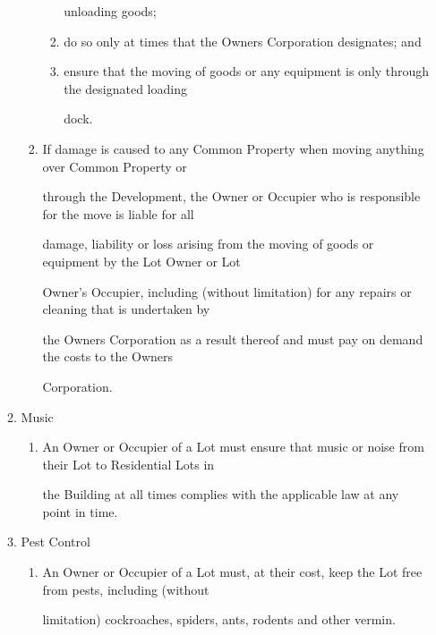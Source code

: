 \documentclass{article}
\begin{document}
\begin{enumerate}[label=\arabic*.]
\begin{enumerate}[label=\arabic{enumi}.\arabic*.]
\begin{enumerate}[label=(\arabic*)]
\begin{enumerate}[label=(\alph*)]
{\fontsize{10.02}{1}unloading goods; }

\item {\fontsize{9.962}{1} do so only at times that the Owners Corporation designates; and }

\item {\fontsize{9.962}{1} ensure that the moving of goods or any equipment is only through the designated loading }

{\fontsize{10.02}{1}dock. }

\end{enumerate}
\item {\fontsize{9.962}{1} If damage is caused to any Common Property when moving anything over Common Property or }

{\fontsize{10.02}{1}through the Development, the Owner or Occupier who is responsible for the move is liable for all }

{\fontsize{10.02}{1}damage, liability or loss arising from the moving of goods or equipment by the Lot Owner or Lot }

{\fontsize{10.02}{1}Owner’s Occupier, including (without limitation) for any repairs or cleaning that is undertaken by }

{\fontsize{10.02}{1}the Owners Corporation as a result thereof and must pay on demand the costs to the Owners }

{\fontsize{10.02}{1}Corporation. }

\end{enumerate}
\item {\fontsize{9.99}{1} Music }

\begin{enumerate}[label=(\arabic*)]
\item {\fontsize{9.962}{1} An Owner or Occupier of a Lot must ensure that music or noise from their Lot to Residential Lots in }

{\fontsize{10.02}{1}the Building at all times complies with the applicable law at any point in time. }

\end{enumerate}
\item {\fontsize{9.99}{1} Pest Control }

\begin{enumerate}[label=(\arabic*)]
\item {\fontsize{9.962}{1} An Owner or Occupier of a Lot must, at their cost, keep the Lot free from pests, including (without }

{\fontsize{10.02}{1}limitation) cockroaches, spiders, ants, rodents and other vermin. }


\end{enumerate}
\end{enumerate}
\end{enumerate}
\end{document}
